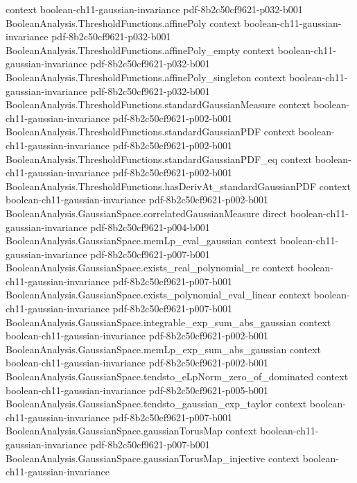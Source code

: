 \begin{theorem}
  {context}
  {boolean-ch11-gaussian-invariance}
  {pdf-8b2c50cf9621-p032-b001}
\proofstep
  {BooleanAnalysis.ThresholdFunctions.affinePoly}
  {context}
  {boolean-ch11-gaussian-invariance}
  {pdf-8b2c50cf9621-p032-b001}
\proofstep
  {BooleanAnalysis.ThresholdFunctions.affinePoly_empty}
  {context}
  {boolean-ch11-gaussian-invariance}
  {pdf-8b2c50cf9621-p032-b001}
\proofstep
  {BooleanAnalysis.ThresholdFunctions.affinePoly_singleton}
  {context}
  {boolean-ch11-gaussian-invariance}
  {pdf-8b2c50cf9621-p032-b001}
\proofstep
  {BooleanAnalysis.ThresholdFunctions.standardGaussianMeasure}
  {context}
  {boolean-ch11-gaussian-invariance}
  {pdf-8b2c50cf9621-p002-b001}
\proofstep
  {BooleanAnalysis.ThresholdFunctions.standardGaussianPDF}
  {context}
  {boolean-ch11-gaussian-invariance}
  {pdf-8b2c50cf9621-p002-b001}
\proofstep
  {BooleanAnalysis.ThresholdFunctions.standardGaussianPDF_eq}
  {context}
  {boolean-ch11-gaussian-invariance}
  {pdf-8b2c50cf9621-p002-b001}
\proofstep
  {BooleanAnalysis.ThresholdFunctions.hasDerivAt_standardGaussianPDF}
  {context}
  {boolean-ch11-gaussian-invariance}
  {pdf-8b2c50cf9621-p002-b001}
\proofstep
  {BooleanAnalysis.GaussianSpace.correlatedGaussianMeasure}
  {direct}
  {boolean-ch11-gaussian-invariance}
  {pdf-8b2c50cf9621-p004-b001}
\proofstep
  {BooleanAnalysis.GaussianSpace.memLp_eval_gaussian}
  {context}
  {boolean-ch11-gaussian-invariance}
  {pdf-8b2c50cf9621-p007-b001}
\proofstep
  {BooleanAnalysis.GaussianSpace.exists_real_polynomial_re}
  {context}
  {boolean-ch11-gaussian-invariance}
  {pdf-8b2c50cf9621-p007-b001}
\proofstep
  {BooleanAnalysis.GaussianSpace.exists_polynomial_eval_linear}
  {context}
  {boolean-ch11-gaussian-invariance}
  {pdf-8b2c50cf9621-p007-b001}
\proofstep
  {BooleanAnalysis.GaussianSpace.integrable_exp_sum_abs_gaussian}
  {context}
  {boolean-ch11-gaussian-invariance}
  {pdf-8b2c50cf9621-p002-b001}
\proofstep
  {BooleanAnalysis.GaussianSpace.memLp_exp_sum_abs_gaussian}
  {context}
  {boolean-ch11-gaussian-invariance}
  {pdf-8b2c50cf9621-p002-b001}
\proofstep
  {BooleanAnalysis.GaussianSpace.tendsto_eLpNorm_zero_of_dominated}
  {context}
  {boolean-ch11-gaussian-invariance}
  {pdf-8b2c50cf9621-p005-b001}
\proofstep
  {BooleanAnalysis.GaussianSpace.tendsto_gaussian_exp_taylor}
  {context}
  {boolean-ch11-gaussian-invariance}
  {pdf-8b2c50cf9621-p007-b001}
\proofstep
  {BooleanAnalysis.GaussianSpace.gaussianTorusMap}
  {context}
  {boolean-ch11-gaussian-invariance}
  {pdf-8b2c50cf9621-p007-b001}
\proofstep
  {BooleanAnalysis.GaussianSpace.gaussianTorusMap_injective}
  {context}
  {boolean-ch11-gaussian-invariance}

\end{theorem}
